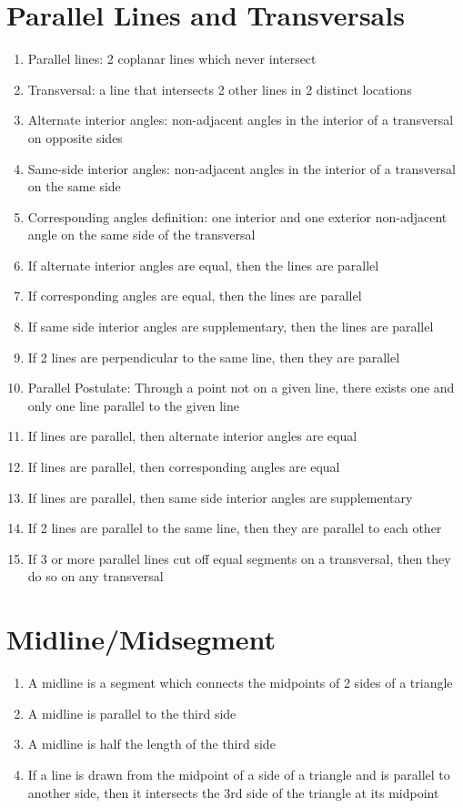 \documentclass[11pt,letterpaper]{report}
\begin{document}
\section*{Parallel Lines and Transversals}
\begin{enumerate}
    \item Parallel lines: 2 coplanar lines which never intersect
    \item Transversal: a line that intersects 2 other lines in 2 distinct locations
    \item Alternate interior angles: non-adjacent angles in the interior of a transversal on opposite sides
    \item Same-side interior angles: non-adjacent angles in the interior of a transversal on the same side
    \item Corresponding angles definition: one interior and one exterior non-adjacent angle on the same side of the transversal
    \item If alternate interior angles are equal, then the lines are parallel
    \item If corresponding angles are equal, then the lines are parallel
    \item If same side interior angles are supplementary, then the lines are parallel
    \item If 2 lines are perpendicular to the same line, then they are parallel
    \item Parallel Postulate: Through a point not on a given line, there exists one and only one line parallel to the given line
    \item If lines are parallel, then alternate interior angles are equal
    \item If lines are parallel, then corresponding angles are equal
    \item If lines are parallel, then same side interior angles are supplementary
    \item If 2 lines are parallel to the same line, then they are parallel to each other
    \item If 3 or more parallel lines cut off equal segments on a transversal, then they do so on any transversal
\end{enumerate}

\section*{Midline/Midsegment}
\begin{enumerate}
    \item A midline is a segment which connects the midpoints of 2 sides of a triangle
    \item A midline is parallel to the third side
    \item A midline is half the length of the third side
    \item If a line is drawn from the midpoint of a side of a triangle and is parallel to another side, then it intersects the 3rd side of the triangle at its midpoint
\end{enumerate}
\end{document}
